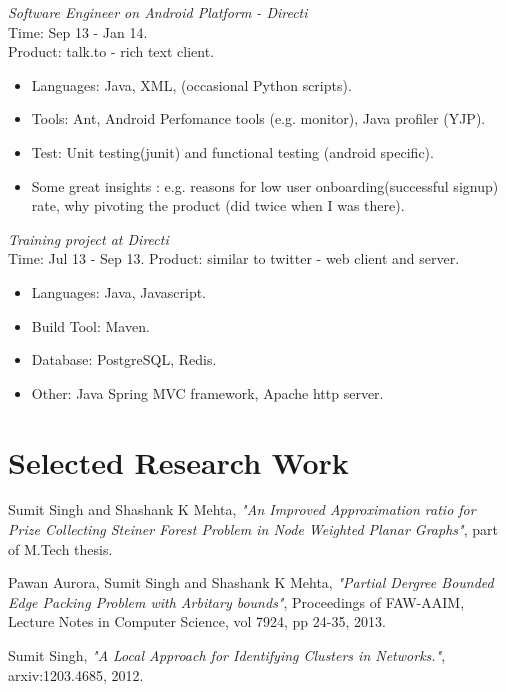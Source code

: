 \documentclass[margin,line]{resume}
\begin{document}
\begin{resume}
\textit{Software Engineer on Android Platform - Directi} \\
Time: Sep 13 - Jan 14.\\
Product: talk.to - rich text client.\\
\begin{itemize}
\item Languages: Java, XML, (occasional Python scripts).
\item Tools: Ant, Android Perfomance tools (e.g. monitor), Java profiler (YJP).
\item Test: Unit testing(junit) and functional testing (android specific).
\item Some great insights : e.g. reasons for low user onboarding(successful signup) rate, why pivoting the product (did twice when I was there).
\end{itemize}

\textit{Training project at Directi}\\
Time: Jul 13 - Sep 13.
Product: similar to twitter - web client and server.\\
 \begin{itemize}
\item Languages: Java, Javascript.
\item Build Tool: Maven.
\item Database: PostgreSQL, Redis.
\item Other: Java Spring MVC framework, Apache http server.  
 \end{itemize}



    \section{\mysidestyle Selected Research Work}
\vspace{-2mm}
Sumit Singh and Shashank K Mehta, \textit{ "An Improved Approximation ratio for Prize Collecting Steiner Forest Problem in Node Weighted Planar Graphs"}, part of M.Tech thesis.

\vspace{-2mm}
Pawan Aurora, Sumit Singh and Shashank K Mehta, \textit{"Partial Dergree Bounded Edge Packing Problem with Arbitary bounds"}, Proceedings of FAW-AAIM, Lecture Notes in Computer Science, vol 7924, pp 24-35, 2013. 

\vspace{-2mm}
Sumit Singh, \textit{"A Local Approach for Identifying Clusters in Networks."}, arxiv:1203.4685, 2012.


\end{resume}
\end{document}
